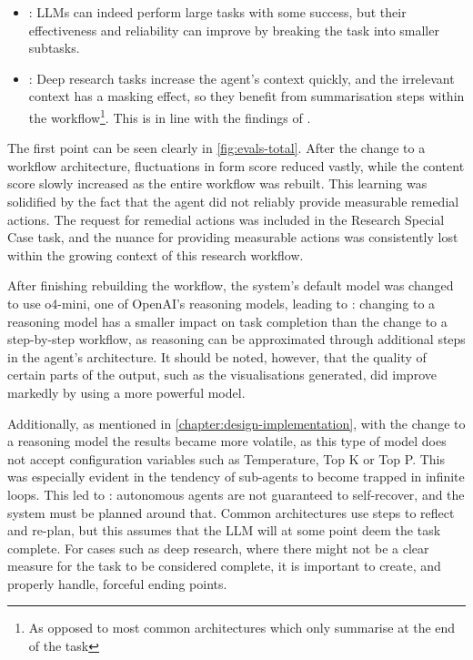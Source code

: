 \documentclass[a4paper]{report}
\begin{document}
\begin{itemize}
    \item {}\kfid : LLMs can indeed perform large tasks with some success, but their effectiveness and reliability can improve by breaking the task into smaller subtasks.
    \item {}\kfid : Deep research tasks increase the agent's context quickly, and the irrelevant context has a masking effect, so they benefit from summarisation steps within the workflow\footnote{As opposed to most common architectures which only summarise at the end of the task}. This is in line with the findings of \cite{veseli2025positionalbiasesshiftinputs}.
\end{itemize}

The first point can be seen clearly in \autoref{fig:evals-total}. After the change to a workflow architecture, fluctuations in form score reduced vastly, while the content score slowly increased as the entire workflow was rebuilt. This learning was solidified by the fact that the agent did not reliably provide measurable remedial actions. The request for remedial actions was included in the Research Special Case task, and the nuance for providing measurable actions was consistently lost within the growing context of this research workflow.

After finishing rebuilding the workflow, the system's default model was changed to use o4-mini, one of OpenAI's reasoning models, leading to \kfid : changing to a reasoning model has a smaller impact on task completion than the change to a step-by-step workflow, as reasoning can be approximated through additional steps in the agent's architecture. It should be noted, however, that the quality of certain parts of the output, such as the visualisations generated, did improve markedly by using a more powerful model.

Additionally, as mentioned in \autoref{chapter:design-implementation}, with the change to a reasoning model the results became more volatile, as this type of model does not accept configuration variables such as Temperature, Top K or Top P. This was especially evident in the tendency of sub-agents to become trapped in infinite loops. This led to \kfid : autonomous agents are not guaranteed to self-recover, and the system must be planned around that. Common architectures use steps to reflect and re-plan, but this assumes that the LLM will at some point deem the task complete. For cases such as deep research, where there might not be a clear measure for the task to be considered complete, it is important to create, and properly handle, forceful ending points.
\end{document}
